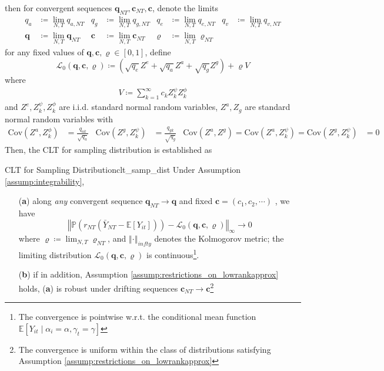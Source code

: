 \documentclass[twoside]{article}
\begin{document}
then for convergent sequences $\mathbf{q}_{NT},\mathbf{c}_{NT},\mathbf{c}$, denote the limits 
\begin{align*}
    q_a &\coloneq \lim_{N,T}q_{a,NT} & q_g &\coloneq \lim_{N,T}q_{g,NT} & q_e & \coloneq \lim_{N,T}q_{e,NT} & q_v & \coloneq \lim_{N,T} q_{v,NT} \\
    \mathbf{q} & \coloneq \lim_{N,T}\mathbf{q}_{NT} & \mathbf{c} & \coloneq \lim_{N,T}\mathbf{c}_{NT} & \varrho &\coloneq \lim_{N,T}\varrho_{NT}
\end{align*}
for any fixed values of $\mathbf{q}, \mathbf{c},\varrho\in[0,1]$, define 
\begin{equation}\label{eq:convergence_law}
    \mathcal{L}_0\left(\mathbf{q},\mathbf{c},\varrho\right) \coloneq \left(\sqrt{q_e}Z^e  + \sqrt{q_a}Z^a + \sqrt{q_g}Z^g\right) + \varrho V
\end{equation}
where 
\begin{align*}
    V \coloneq \sum^{\infty}_{k=1}c_k Z^{\psi}_k Z^{\phi}_k
\end{align*}
and $Z^e,Z_k^{\psi},Z_k^{\phi}$ are i.i.d. standard normal random variables, $Z^a,Z_g$ are standard normal random variables with 
\begin{align*}
    \mathrm{Cov}\left(Z^a,Z_k^{\phi}\right) &= \frac{q_{ak}}{\sqrt{q_a}} & \mathrm{Cov}\left(Z^g,Z_k^{\psi}\right) &= \frac{q_{gk}}{\sqrt{q_g}} & \mathrm{Cov}\left(Z^a,Z^g\right) = \mathrm{Cov}\left(Z^a,Z_k^{\psi}\right) = \mathrm{Cov}\left(Z^g,Z_k^{\psi}\right) &=0
\end{align*}
Then, the CLT for sampling distribution is established as
\begin{theorem}{CLT for Sampling Distribution}{clt_samp_dist}
    Under Assumption \ref{assump:integrability},
    \begin{itemize}
        \item[(\textbf{a})] along \textit{any} convergent sequence $\mathbf{q}_{NT}\rightarrow \mathbf{q}$ and fixed $\mathbf{c} = \left(c_1,c_2,\cdots\right)$ , we have 
        \begin{equation*}
            \left\Vert \mathbb{P}\left(r_{NT}\left(\bar{Y}_{NT}-\mathbb{E}[Y_{it}]\right)\right) - \mathcal{L}_0 \left(\mathbf{q},\mathbf{c},\varrho \right) \right\Vert _{\infty} \rightarrow 0
        \end{equation*}
        where $\varrho \coloneq \lim_{N,T}\varrho_{NT}$, and $\left\Vert \cdot \right\Vert _{infty}$ denotes the Kolmogorov metric; the limiting distribution $\mathcal{L}_0\left(\mathbf{q},\mathbf{c},\varrho\right)$ is continuous\footnote{The convergence is pointwise w.r.t. the conditional mean function $\mathbb{E}\left[Y_{it} \mid \alpha_i=\alpha,\gamma_t=\gamma\right]$}.
        \item[(\textbf{b})] if in addition, Assumption \ref{assump:restrictions_on_lowrankapprox} holds, (\textbf{a}) is robust under drifting sequences $\mathbf{c}_{NT}\rightarrow \mathbf{c}$\footnote{The convergence is uniform within the class of distributions satisfying Assumption \ref{assump:restrictions_on_lowrankapprox}}
    \end{itemize}
\end{theorem}
\end{document}
